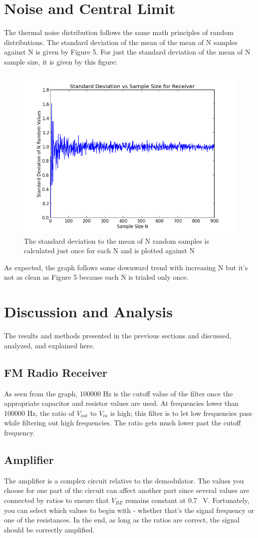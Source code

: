 \documentclass[12pt]{article}
\begin{document}
\section{Noise and Central Limit}
The thermal noise distribution follows the same math principles of
random distributions. The standard deviation of the mean of the mean of
N samples against N is given by Figure 5. For just the standard
deviation of the mean of N sample size, it is given by this figure:
\begin{figure}[H]
\centering
\includegraphics[width=.9\textwidth]{allen_2.png}
\caption{The standard deviation to the mean of N random samples is
  calculated just once for each N and is plotted against N}
\end{figure}
As expected, the graph follows some downward trend with increasing N but
it's not as clean as Figure 5 because each N is trialed only once.
\section{Discussion and Analysis}
The results and methods presented in the previous sections and discussed, analyzed,
and explained here.
\subsection{FM Radio Receiver}
As seen from the graph, 100000 Hz is the cutoff value of the filter once
the appropriate capacitor and resistor values are used. At frequencies
lower than 100000 Hz, the ratio of $V_{out}$ to $V_{in}$ is high; this
filter is to let low frequencies pass while filtering out high
frequencies. The ratio gets much lower past the cutoff frequency.
\subsection{Amplifier}
The amplifier is a complex circuit relative to the demodulator. The
values you choose for one part of the circuit can affect another part
since several values are connected by ratios to ensure that $V_{BE}$
remains constant at 0.7~ V. Fortunately, you can select which values to
begin with - whether that's the signal frequency or one of the
resistances. In the end, as long as the ratios are correct, the signal
should be correctly amplified.
\end{document}
